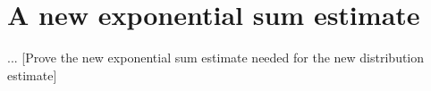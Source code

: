 \section{A new exponential sum estimate}\label{exponential-sec}

... [Prove the new exponential sum estimate needed for the new distribution estimate]
